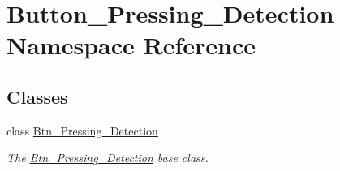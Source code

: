 \hypertarget{a00020}{}\section{Button\+\_\+\+Pressing\+\_\+\+Detection Namespace Reference}
\label{a00020}
\subsection*{Classes}
\begin{DoxyCompactItemize}
\item 
class \hyperlink{a00029}{Btn\+\_\+\+Pressing\+\_\+\+Detection}
\begin{DoxyCompactList}\small\item\em The \hyperlink{a00029}{Btn\+\_\+\+Pressing\+\_\+\+Detection} base class. \end{DoxyCompactList}\end{DoxyCompactItemize}
